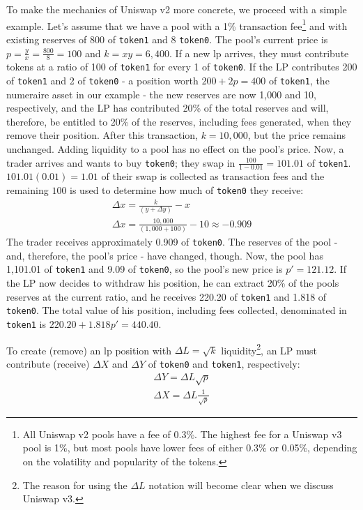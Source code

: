 \documentclass[11pt]{article}
\begin{document}
To make the mechanics of Uniswap v2 more concrete, we proceed with a simple example. Let's assume that we have a pool with a 1\% transaction fee\footnote{All Uniswap v2 pools have a fee of 0.3\%. The highest fee for a Uniswap v3 pool is 1\%, but most pools have lower fees of either 0.3\% or 0.05\%, depending on the volatility and popularity of the tokens.} and with existing reserves of 800 of \texttt{token1} and 8 \texttt{token0}. The pool's current price is $p=\frac{y}{x}=\frac{800}{8}=100$ and $k=xy=6,400$. If a new \gls{lp} arrives, they must contribute tokens at a ratio of 100 of \texttt{token1} for every 1 of \texttt{token0}. If the LP contributes 200 of \texttt{token1} and 2 of \texttt{token0} - a position worth $200 + 2 p = 400$ of \texttt{token1}, the numeraire asset in our example - the new reserves are now 1,000 and 10, respectively, and the LP has contributed 20\% of the total reserves and will, therefore, be entitled to 20\% of the reserves, including fees generated, when they remove their position. After this transaction, $k=10,000$, but the price remains unchanged. Adding liquidity to a pool has no effect on the pool's price. Now, a trader arrives and wants to buy \texttt{token0}; they swap in $\frac{100}{1 - 0.01} = 101.01$ of \texttt{token1}. $101.01(0.01) = 1.01$ of their swap is collected as transaction fees and the remaining $100$ is used to determine how much of \texttt{token0} they receive:
\begin{gather*}
    \Delta x = \frac{k}{(y + \Delta y)} - x \\
    \Delta x = \frac{10,000}{(1,000 + 100)} - 10 \approx -0.909
\end{gather*}
The trader receives approximately 0.909 of \texttt{token0}. The reserves of the pool - and, therefore, the pool's price - have changed, though. Now, the pool has 1,101.01 of \texttt{token1} and 9.09 of \texttt{token0}, so the pool's new price is $p' = 121.12$. If the LP now decides to withdraw his position, he can extract 20\% of the pools reserves at the current ratio, and he receives 220.20 of \texttt{token1} and 1.818 of \texttt{token0}. The total value of his position, including fees collected, denominated in \texttt{token1} is $220.20 + 1.818 p' = 440.40$.

To create (remove) an \gls{lp} position with $\Delta L = \sqrt{k}$ liquidity\footnote{The reason for using the $\Delta L$ notation will become clear when we discuss Uniswap v3.}, an LP must contribute (receive) $\Delta X$ and $\Delta Y$ of \texttt{token0} and \texttt{token1}, respectively:
\begin{gather}
    \Delta Y = \Delta L \sqrt{p} \label{eq:3}\\
    \Delta X = \Delta L \frac{1}{\sqrt{p}} \label{eq:4}
\end{gather}
\end{document}
